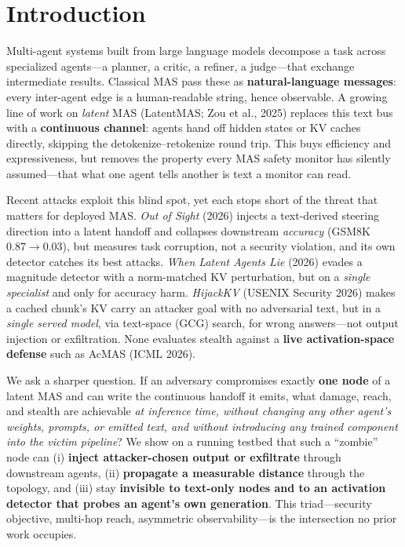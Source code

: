 \documentclass{article}
\begin{document}
\section{Introduction}
Multi-agent systems built from large language models decompose a task across specialized agents---a planner, a critic, a refiner, a judge---that exchange intermediate results. Classical MAS pass these as \textbf{natural-language messages}: every inter-agent edge is a human-readable string, hence observable. A growing line of work on \emph{latent} MAS (LatentMAS; Zou et al., 2025) replaces this text bus with a \textbf{continuous channel}: agents hand off hidden states or KV caches directly, skipping the detokenize--retokenize round trip. This buys efficiency and expressiveness, but removes the property every MAS safety monitor has silently assumed---that what one agent tells another is text a monitor can read.

Recent attacks exploit this blind spot, yet each stops short of the threat that matters for deployed MAS. \emph{Out of Sight} (2026) injects a text-derived steering direction into a latent handoff and collapses downstream \emph{accuracy} (GSM8K $0.87\to0.03$), but measures task corruption, not a security violation, and its own detector catches its best attacks. \emph{When Latent Agents Lie} (2026) evades a magnitude detector with a norm-matched KV perturbation, but on a \emph{single specialist} and only for accuracy harm. \emph{HijackKV} (USENIX Security 2026) makes a cached chunk's KV carry an attacker goal with no adversarial text, but in a \emph{single served model}, via text-space (GCG) search, for wrong answers---not output injection or exfiltration. None evaluates stealth against a \textbf{live activation-space defense} such as AcMAS (ICML 2026).

We ask a sharper question. If an adversary compromises exactly \textbf{one node} of a latent MAS and can write the continuous handoff it emits, what damage, reach, and stealth are achievable \emph{at inference time, without changing any other agent's weights, prompts, or emitted text, and without introducing any trained component into the victim pipeline}? We show on a running testbed that such a ``zombie'' node can (i) \textbf{inject attacker-chosen output or exfiltrate} through downstream agents, (ii) \textbf{propagate a measurable distance} through the topology, and (iii) stay \textbf{invisible to text-only nodes and to an activation detector that probes an agent's own generation}. This triad---security objective, multi-hop reach, asymmetric observability---is the intersection no prior work occupies.
\end{document}
